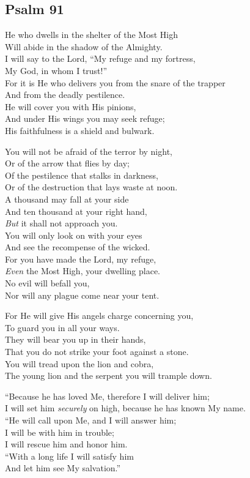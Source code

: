 \documentclass[14pt]{extbook}
\begin{document}
\hypertarget{psalm-91}{%
\subsection{Psalm 91}\label{psalm-91}}

He who dwells in the shelter of the Most High\\
Will abide in the shadow of the Almighty.\\
I will say to the Lord, ``My refuge and my fortress,\\
My God, in whom I trust!''\\
For it is He who delivers you from the snare of the trapper\\
And from the deadly pestilence.\\
He will cover you with His pinions,\\
And under His wings you may seek refuge;\\
His faithfulness is a shield and bulwark.

You will not be afraid of the terror by night,\\
Or of the arrow that flies by day;\\
Of the pestilence that stalks in darkness,\\
Or of the destruction that lays waste at noon.\\
A thousand may fall at your side\\
And ten thousand at your right hand,\\
\emph{But} it shall not approach you.\\
You will only look on with your eyes\\
And see the recompense of the wicked.\\
For you have made the Lord, my refuge,\\
\emph{Even} the Most High, your dwelling place.\\
No evil will befall you,\\
Nor will any plague come near your tent.

For He will give His angels charge concerning you,\\
To guard you in all your ways.\\
They will bear you up in their hands,\\
That you do not strike your foot against a stone.\\
You will tread upon the lion and cobra,\\
The young lion and the serpent you will trample down.

``Because he has loved Me, therefore I will deliver him;\\
I will set him \emph{securely} on high, because he has known My name.\\
``He will call upon Me, and I will answer him;\\
I will be with him in trouble;\\
I will rescue him and honor him.\\
``With a long life I will satisfy him\\
And let him see My salvation.''
\end{document}
